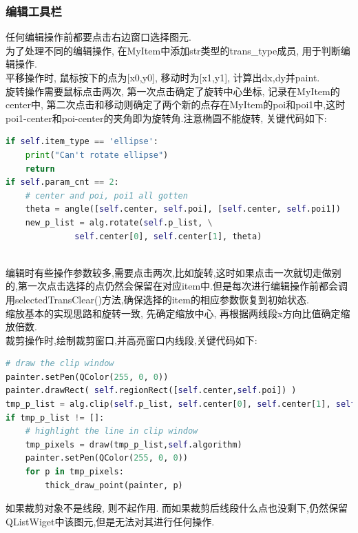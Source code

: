 \documentclass[a4paper,UTF8]{article}
\theoremstyle{definition}
\begin{document}
\subsubsection{编辑工具栏}
\indent 任何编辑操作前都要点击右边窗口选择图元.\\
\indent 为了处理不同的编辑操作, 在MyItem中添加str类型的trans\_type成员, 用于判断编辑操作.\\
\indent 平移操作时, 鼠标按下的点为[x0,y0], 移动时为[x1,y1], 计算出dx,dy并paint.\\
\indent 旋转操作需要鼠标点击两次, 第一次点击确定了旋转中心坐标, 记录在MyItem的center中, 第二次点击和移动则确定了两个新的点存在MyItem的poi和poi1中,这时poi1-center和poi-center的夹角即为旋转角.注意椭圆不能旋转, 关键代码如下:\\
\begin{lstlisting}[language={python}]
if self.item_type == 'ellipse':
    print("Can't rotate ellipse")
    return 
if self.param_cnt == 2:
    # center and poi, poi1 all gotten
    theta = angle([self.center, self.poi], [self.center, self.poi1])
    new_p_list = alg.rotate(self.p_list, \
              self.center[0], self.center[1], theta)
\end{lstlisting}
\indent\\
\indent 编辑时有些操作参数较多,需要点击两次,比如旋转,这时如果点击一次就切走做别的,第一次点击选择的点仍然会保留在对应item中.但是每次进行编辑操作前都会调用selectedTransClear()方法,确保选择的item的相应参数恢复到初始状态.\\
\indent 缩放基本的实现思路和旋转一致, 先确定缩放中心, 再根据两线段x方向比值确定缩放倍数.\\
\indent 裁剪操作时,绘制裁剪窗口,并高亮窗口内线段,关键代码如下: \\
\begin{lstlisting}[language={python}]
# draw the clip window
painter.setPen(QColor(255, 0, 0))
painter.drawRect( self.regionRect([self.center,self.poi]) )                 
tmp_p_list = alg.clip(self.p_list, self.center[0], self.center[1], self.poi[0], self.poi[1], self.trans_algorithm)
if tmp_p_list != []:
    # highlight the line in clip window
    tmp_pixels = draw(tmp_p_list,self.algorithm)
    painter.setPen(QColor(255, 0, 0))
    for p in tmp_pixels:
        thick_draw_point(painter, p)
\end{lstlisting}
\indent 如果裁剪对象不是线段, 则不起作用. 而如果裁剪后线段什么点也没剩下,仍然保留QListWiget中该图元,但是无法对其进行任何操作.
\end{document}
